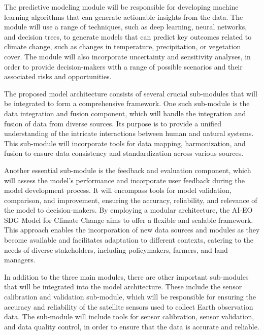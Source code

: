 \documentclass[draft, {\secondLanguage}, english]{volcanica-template}
\begin{document}
The predictive modeling module will be responsible for developing machine learning algorithms that can generate actionable insights from the data. The module will use a range of techniques, such as deep learning, neural networks, and decision trees, to generate models that can predict key outcomes related to climate change, such as changes in temperature, precipitation, or vegetation cover. The module will also incorporate uncertainty and sensitivity analyses, in order to provide decision-makers with a range of possible scenarios and their associated risks and opportunities.

The proposed model architecture consists of several crucial sub-modules that will be integrated to form a comprehensive framework. One such sub-module is the data integration and fusion component, which will handle the integration and fusion of data from diverse sources. Its purpose is to provide a unified understanding of the intricate interactions between human and natural systems. This sub-module will incorporate tools for data mapping, harmonization, and fusion to ensure data consistency and standardization across various sources.

Another essential sub-module is the feedback and evaluation component, which will assess the model's performance and incorporate user feedback during the model development process. It will encompass tools for model validation, comparison, and improvement, ensuring the accuracy, reliability, and relevance of the model to decision-makers. By employing a modular architecture, the AI-EO SDG Model for Climate Change aims to offer a flexible and scalable framework. This approach enables the incorporation of new data sources and modules as they become available and facilitates adaptation to different contexts, catering to the needs of diverse stakeholders, including policymakers, farmers, and land managers.


In addition to the three main modules, there are other important sub-modules that will be integrated into the model architecture. These include the sensor calibration and validation sub-module, which will be responsible for ensuring the accuracy and reliability of the satellite sensors used to collect Earth observation data. The sub-module will include tools for sensor calibration, sensor validation, and data quality control, in order to ensure that the data is accurate and reliable.
\end{document}
